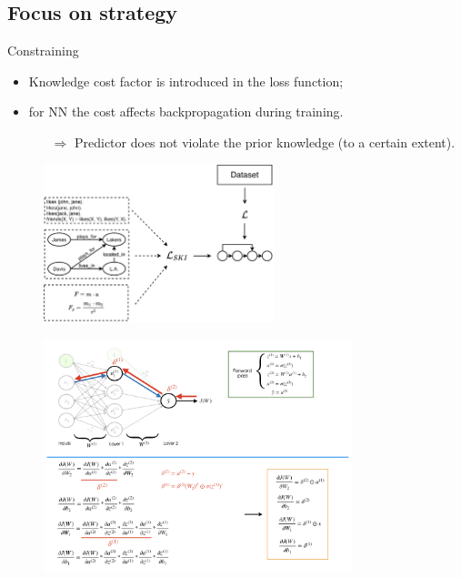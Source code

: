 \documentclass[presentation]{beamer}\mode<presentation>{\usetheme{AMSBolognaFC}}
\begin{document}
\subsection{Focus on strategy}

\begin{frame}[allowframebreaks]{Constraining}
    \begin{itemize}
        \item Knowledge cost factor is introduced in the loss function;
        \item for NN the cost affects backpropagation  during training.
        \begin{itemize}
            \item[$\Rightarrow$] Predictor does not violate the prior knowledge (to a certain extent).
        \end{itemize} 
    \end{itemize}
    
    \begin{figure}
        \centering
        \includegraphics[width=0.6\textwidth]{figures/ski-constraining}
    \end{figure}
    
    \framebreak
    
    \begin{figure}
        \centering
        \includegraphics[width=0.8\textwidth]{figures/nn-backprop.png}
    \end{figure}


\end{frame}
\end{document}
